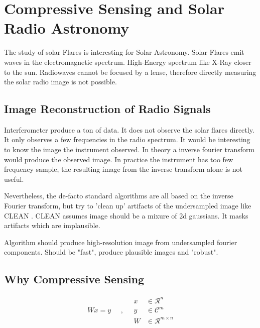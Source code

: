 \section{Compressive Sensing and Solar Radio Astronomy}\label{intro}
The study of solar Flares is interesting for Solar Astronomy. Solar Flares emit waves in the electromagnetic spectrum. High-Energy spectrum like X-Ray  closer to the sun. Radiowaves cannot be focused by a lense, therefore directly measuring the solar radio image is not possible.

\subsection{Image Reconstruction of Radio Signals}
Interferometer produce a ton of data. It does not observe the solar flares directly. It only observes a few frequencies in the radio spectrum. It would be interesting to know the image the instrument observed. In theory a inverse fourier transform would produce the observed image. In practice the instrument has too few frequency sample, the resulting image from the inverse transform alone is not useful.

Nevertheless, the de-facto standard algorithms are all based on the inverse Fourier transform, but try to 'clean up' artifacts of the undersampled image like CLEAN \cite{hogbom1974aperture}. CLEAN assumes image should be a mixure of 2d gaussians. It masks artifacts which are implausible.

Algorithm should produce high-resolution image from undersampled fourier components. Should be "fast", produce plausible images and "robust".

\subsection{Why Compressive Sensing}
\begin{equation}\label{fourier:reconstruction}
\begin{split}
Wx = y
\end{split}
\quad , \quad
\begin{split}
x &\in \mathcal{R}^n\\
y &\in \mathcal{C}^m\\
W &\in \mathcal{R}^{m \times n}
\end{split}
\end{equation}

